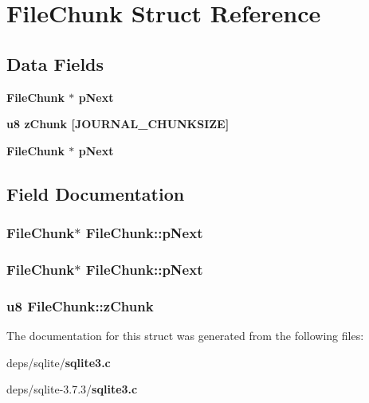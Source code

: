 \section{File\-Chunk Struct Reference}
\label{structFileChunk}
\subsection*{Data Fields}
\begin{CompactItemize}
\item 
\bf{File\-Chunk} $\ast$ \bf{p\-Next}
\item 
\bf{u8} \bf{z\-Chunk} [JOURNAL\_\-CHUNKSIZE]
\item 
\bf{File\-Chunk} $\ast$ \bf{p\-Next}
\end{CompactItemize}


\subsection{Field Documentation}
\subsubsection{\setlength{\rightskip}{0pt plus 5cm}\bf{File\-Chunk}$\ast$ \bf{File\-Chunk::p\-Next}}\label{structFileChunk_a026e844263cc7fee06234dc85cdd4dd}


\subsubsection{\setlength{\rightskip}{0pt plus 5cm}\bf{File\-Chunk}$\ast$ \bf{File\-Chunk::p\-Next}}\label{structFileChunk_a026e844263cc7fee06234dc85cdd4dd}


\subsubsection{\setlength{\rightskip}{0pt plus 5cm}\bf{u8} \bf{File\-Chunk::z\-Chunk}}\label{structFileChunk_9ecb288e958a99efaa4c1ab3f0f4d3b4}




The documentation for this struct was generated from the following files:\begin{CompactItemize}
\item 
deps/sqlite/\bf{sqlite3.c}\item 
deps/sqlite-3.7.3/\bf{sqlite3.c}\end{CompactItemize}
